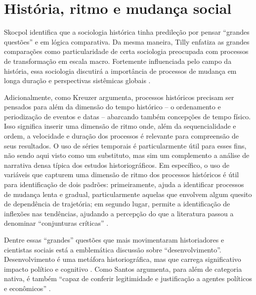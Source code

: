 \section{História, ritmo e mudança social}

Skocpol 
identifica que a sociologia histórica tinha predileção por pensar
``grandes questões'' e em lógica comparativa. Da mesma maneira, Tilly
\citet{tilly_big_1984} enfatiza as
grandes comparações como particularidade de certa sociologia preocupada
com processos de transformação em escala macro. Fortemente influenciada
pelo campo da história, essa sociologia discutirá a importância de
processos de mudança em longa duração e perspectivas sistêmicas
globais \citep{smith_rise_1991}.

Adicionalmente, como Kreuzer
\citet{kreuzer_grammar_2023} argumenta,
processos históricos precisam ser pensados para além da dimensão do
tempo histórico -- o ordenamento e periodização de eventos e datas --
abarcando também concepções de tempo físico. Isso significa inserir uma
dimensão de ritmo onde, além da sequencialidade e ordem, a velocidade e
duração dos processos é relevante para compreensão de seus resultados. O
uso de séries temporais é particularmente útil para esses fins, não
sendo aqui visto como um substituto, mas sim um complemento a análise de
narrativa densa típica dos estudos historiográficos. Em específico, o
uso de variáveis que capturem uma dimensão de ritmo dos processos
históricos é útil para identificação de dois padrões: primeiramente,
ajuda a identificar processos de mudança lenta e gradual,
particularmente aquelas que envolvem algum quesito de dependência de
trajetória; em segundo lugar, permite a identificação de inflexões nas
tendências, ajudando a percepção do que a literatura passou a denominar
``conjunturas críticas''
\citep{mahoney_path_2000,mahoney_comparative-historical_2004,pierson_power_2015,thelen2010}.

Dentre essas ``grandes'' questões que mais movimentaram historiadores e
cientistas sociais está a emblemática discussão sobre
``desenvolvimento''. Desenvolvimento é uma metáfora historiográfica, mas
que carrega significativo impacto político e cognitivo
\citep{fernandez_sebastian_key_2024}. Como Santos argumenta, para além de categoria nativa, é também
``capaz de conferir legitimidade e justificação a agentes políticos e
econômicos'' \citep[p.~295]{santos_desenvolvimento_2016}.

